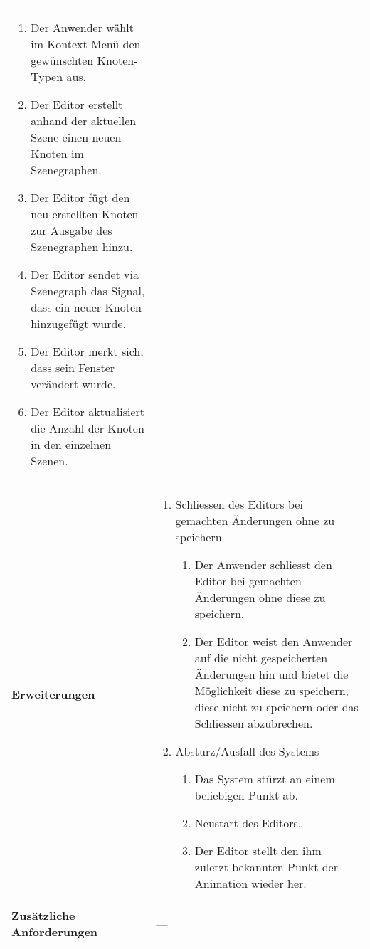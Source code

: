 \begin{longtabu}{p{0.5\textwidth}p{0.5\textwidth}}
\begin{enumerate}
{                    sich.}
            \item{Der Anwender wählt im Kontext-Menü den gewünschten
                    Knoten-Typen aus.}
            \item{Der Editor erstellt anhand der aktuellen Szene einen
                    neuen Knoten im Szenegraphen.}
            \item{Der Editor fügt den neu erstellten Knoten zur Ausgabe des
                    Szenegraphen hinzu.}
            \item{Der Editor sendet via Szenegraph das Signal, dass ein
                    neuer Knoten hinzugefügt wurde.}
            \item{Der Editor merkt sich, dass sein Fenster verändert
                    wurde.}
            \item{Der Editor aktualisiert die Anzahl der Knoten in den
                    einzelnen Szenen.}
        \end{enumerate} \\
    \cmidrule(r){1-1}\cmidrule(lr){2-2}
        \textbf{Erweiterungen} &
        \begin{enumerate}[label= (\alph*)]
            \item{Schliessen des Editors bei gemachten Änderungen ohne zu
                    speichern
                \begin{enumerate}[label= (\roman*)]
                    \item{Der Anwender schliesst den Editor bei gemachten
                            Änderungen ohne diese zu speichern.}
                    \item{Der Editor weist den Anwender auf die
                            nicht gespeicherten Änderungen hin und bietet
                            die Möglichkeit diese zu speichern, diese nicht
                            zu speichern oder das Schliessen abzubrechen.}
                \end{enumerate}
            }
            \item{Absturz/Ausfall des Systems
                \begin{enumerate}[label= (\roman*)]
                        \item{Das System stürzt an einem beliebigen Punkt
                                ab.}
                        \item{Neustart des Editors.}
                        \item{Der Editor stellt den ihm zuletzt bekannten
                                Punkt der Animation wieder her.}
                \end{enumerate}
            }
        \end{enumerate}
        \\
    \cmidrule(r){1-1}\cmidrule(lr){2-2}
        \textbf{Zusätzliche Anforderungen} &
        --- \\
    \bottomrule
\end{longtabu}
